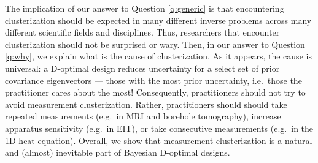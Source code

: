 \begin{enumerate}





\end{enumerate}

The implication of our answer to Question \ref{q:generic} is that
encountering clusterization should be expected in many different
inverse problems across many different scientific fields and
disciplines. Thus, researchers that encounter clusterization should
not be surprised or wary. Then, in our answer to Question \ref{q:why},
we explain what is the cause of clusterization. As it appears, the
cause is universal: a D-optimal design reduces uncertainty for a
select set of prior covariance eigenvectors --- those with the most
prior uncertainty, i.e.~those the practitioner cares about the most!
Consequently, practitioners should not try to avoid measurement
clusterization. Rather, practitioners should should take repeated
measurements (e.g.~in MRI and borehole tomography), increase apparatus
sensitivity (e.g.~in EIT), or take consecutive measurements (e.g.~in
the 1D heat equation). Overall, we show that measurement
clusterization is a natural and (almost) inevitable part of Bayesian
D-optimal designs.


